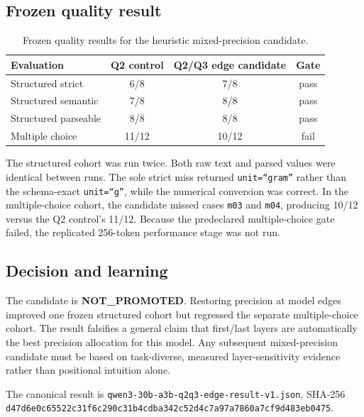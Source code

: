\subsection{Frozen quality result}

\begin{table}[ht]
\centering
\begin{tabular}{lccc}
\toprule
Evaluation & Q2 control & Q2/Q3 edge candidate & Gate \\
\midrule
Structured strict & 6/8 & 7/8 & pass \\
Structured semantic & 7/8 & 8/8 & pass \\
Structured parseable & 8/8 & 8/8 & pass \\
Multiple choice & 11/12 & 10/12 & fail \\
\bottomrule
\end{tabular}
\caption{Frozen quality results for the heuristic mixed-precision candidate.}
\end{table}

The structured cohort was run twice.  Both raw text and parsed values were
identical between runs.  The sole strict miss returned
\texttt{unit=``gram''} rather than the schema-exact \texttt{unit=``g''}, while
the numerical conversion was correct.  In the multiple-choice cohort, the
candidate missed cases \texttt{m03} and \texttt{m04}, producing 10/12 versus
the Q2 control's 11/12.  Because the predeclared multiple-choice gate failed,
the replicated 256-token performance stage was not run.

\subsection{Decision and learning}

The candidate is \textbf{NOT\_PROMOTED}.  Restoring precision at model edges
improved one frozen structured cohort but regressed the separate
multiple-choice cohort.  The result falsifies a general claim that first/last
layers are automatically the best precision allocation for this model.  Any
subsequent mixed-precision candidate must be based on task-diverse, measured
layer-sensitivity evidence rather than positional intuition alone.

The canonical result is
\texttt{qwen3-30b-a3b-q2q3-edge-result-v1.json}, SHA-256
\texttt{d47d6e0c65522c31f6c290c31b4cdba342c52d4c7a97a7860a7cf9d483eb0475}.
